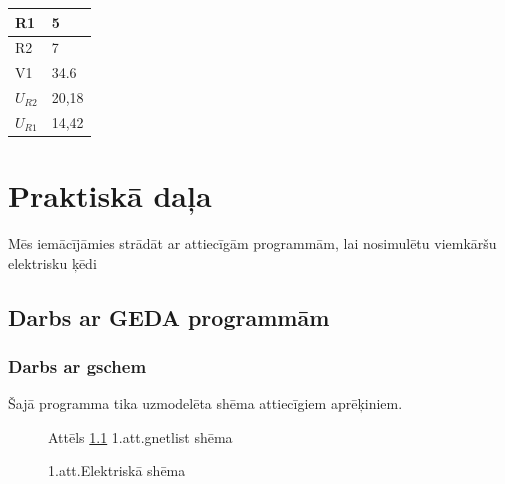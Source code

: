\documentclass{report}
\begin{document}
{\begin{tabular}{ |p{2cm}|p{2cm}| }
\hline
R{1} & 5 \\
\hline
R2 & 7\\
\hline
V1 & 34.6\\
\hline
$U_{R2}$ & 20,18\\
\hline
$U_{R1}$ & 14,42\\
\hline
\end{tabular}




\chapter{Praktiskā daļa}
Mēs iemācījāmies strādāt ar attiecīgām programmām, lai nosimulētu viemkāršu elektrisku ķēdi

\section{Darbs ar GEDA programmām}
\subsection{Darbs ar gschem}
Šajā programma tika uzmodelēta shēma attiecīgiem aprēķiniem.

\begin{figure}[!h]
\caption{1.att.Elektriskā shēma}
\label{fig:01.ps}
Attēls \ref{fig:01.ps} 1.att.gnetlist shēma
\end{figure}

}
\end{document}
